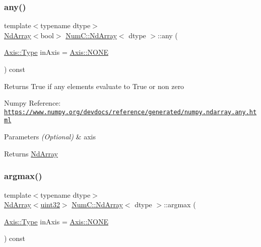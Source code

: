 \subsubsection{\texorpdfstring{any()}{any()}}
{\footnotesize\ttfamily template$<$typename dtype$>$ \\
\mbox{\hyperlink{class_num_c_1_1_nd_array}{Nd\+Array}}$<$bool$>$ \mbox{\hyperlink{class_num_c_1_1_nd_array}{Num\+C\+::\+Nd\+Array}}$<$ dtype $>$\+::any (\begin{DoxyParamCaption}\item[{\mbox{\hyperlink{struct_num_c_1_1_axis_a8e689044ef1941a03482e730c5e7ebb3}{Axis\+::\+Type}}}]{in\+Axis = {\ttfamily \mbox{\hyperlink{struct_num_c_1_1_axis_a8e689044ef1941a03482e730c5e7ebb3a0ae033c4226f7184bf0050b101e7ed94}{Axis\+::\+N\+O\+NE}}} }\end{DoxyParamCaption}) const\hspace{0.3cm}{\ttfamily [inline]}}

Returns True if any elements evaluate to True or non zero

Numpy Reference\+: \href{https://www.numpy.org/devdocs/reference/generated/numpy.ndarray.any.html}{\tt https\+://www.\+numpy.\+org/devdocs/reference/generated/numpy.\+ndarray.\+any.\+html}


\begin{DoxyParams}{Parameters}
{\em (\+Optional)} & axis \\
\hline
\end{DoxyParams}
\begin{DoxyReturn}{Returns}
\mbox{\hyperlink{class_num_c_1_1_nd_array}{Nd\+Array}} 
\end{DoxyReturn}
\mbox{\label{class_num_c_1_1_nd_array_a54f2e7b6313e1d3641cf23285842dfdf}} 
\subsubsection{\texorpdfstring{argmax()}{argmax()}}
{\footnotesize\ttfamily template$<$typename dtype$>$ \\
\mbox{\hyperlink{class_num_c_1_1_nd_array}{Nd\+Array}}$<$\mbox{\hyperlink{namespace_num_c_ae685802ca6d3035f2b400b081e3953fa}{uint32}}$>$ \mbox{\hyperlink{class_num_c_1_1_nd_array}{Num\+C\+::\+Nd\+Array}}$<$ dtype $>$\+::argmax (\begin{DoxyParamCaption}\item[{\mbox{\hyperlink{struct_num_c_1_1_axis_a8e689044ef1941a03482e730c5e7ebb3}{Axis\+::\+Type}}}]{in\+Axis = {\ttfamily \mbox{\hyperlink{struct_num_c_1_1_axis_a8e689044ef1941a03482e730c5e7ebb3a0ae033c4226f7184bf0050b101e7ed94}{Axis\+::\+N\+O\+NE}}} }\end{DoxyParamCaption}) const\hspace{0.3cm}{\ttfamily [inline]}}

